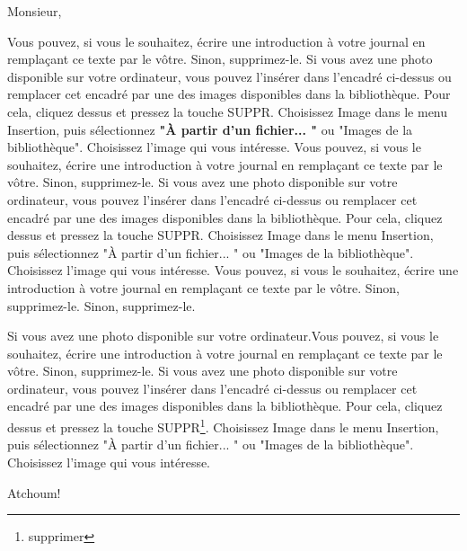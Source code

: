 \documentclass[10pt]{letter}
\date{Lausanne, le 19 février 2020}
\begin{document}
\subject{Concerne: commodo consequat}
Monsieur,

Vous pouvez, si vous le souhaitez, écrire une introduction à votre journal en remplaçant ce texte par le vôtre. Sinon, supprimez-le. Si vous avez une photo disponible sur votre ordinateur, vous pouvez l'insérer dans l'encadré ci-dessus ou remplacer cet encadré par une des images disponibles dans la bibliothèque. Pour cela, cliquez dessus et pressez la touche SUPPR. Choisissez Image dans le menu Insertion, puis sélectionnez \textbf{"À partir d'un fichier... "} ou "Images de la bibliothèque". Choisissez l'image qui vous intéresse. 
Vous pouvez, si vous le souhaitez, écrire une introduction à votre journal en remplaçant ce texte par le vôtre. Sinon, supprimez-le. Si vous avez une photo disponible sur votre ordinateur, vous pouvez l'insérer dans l'encadré ci-dessus ou remplacer cet encadré par une des images disponibles dans la bibliothèque. Pour cela, cliquez dessus et pressez la touche SUPPR. Choisissez Image dans le menu Insertion, puis sélectionnez "À partir d'un fichier... " ou "Images de la bibliothèque". Choisissez l'image qui vous intéresse.
Vous pouvez, si vous le souhaitez, écrire une introduction à votre journal en remplaçant ce texte par le vôtre. Sinon, supprimez-le. Sinon, supprimez-le.

Si vous avez une photo disponible sur votre ordinateur.Vous pouvez, si vous le souhaitez, écrire une introduction à votre journal en remplaçant ce texte par le vôtre. Sinon, supprimez-le. Si vous avez une photo disponible sur votre ordinateur, vous pouvez l'insérer dans l'encadré ci-dessus ou remplacer cet encadré par une des images disponibles dans la bibliothèque. Pour cela, cliquez dessus et pressez la touche SUPPR\footnote{supprimer}. Choisissez Image dans le menu Insertion, puis sélectionnez "À partir d'un fichier... " ou "Images de la bibliothèque". Choisissez l'image qui vous intéresse.

Atchoum!
\signature{Lukas Baumgartner}
\end{document}
